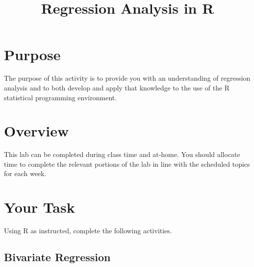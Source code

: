 \documentclass[a4paper,12pt]{article}
\title{Regression Analysis in R}
\author{}
\date{}
\begin{document}
\vspace{-4em}

\maketitle

\vspace{-4em}

\section{Purpose}

The purpose of this activity is to provide you with an understanding of regression analysis and to both develop and apply that knowledge to the use of the R statistical programming environment.

\section{Overview}

This lab can be completed during class time and at-home. You should allocate time to complete the relevant portions of the lab in line with the scheduled topics for each week.

\section{Your Task}

Using R as instructed, complete the following activities.

\subsection{Bivariate Regression}
\end{document}
